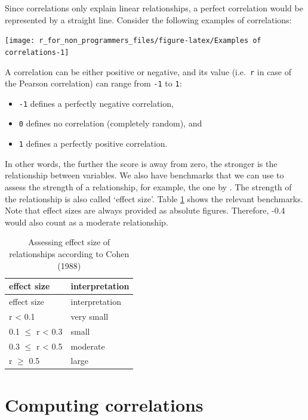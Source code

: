 \documentclass[
]{book}
\begin{document}
Since correlations only explain linear relationships, a perfect correlation would be represented by a straight line. Consider the following examples of correlations:

\begin{center}\texttt{[image: r\_for\_non\_programmers\_files/figure-latex/Examples of correlations-1]} \end{center}

A correlation can be either positive or negative, and its value (i.e.~\texttt{r} in case of the Pearson correlation) can range from \texttt{-1} to \texttt{1}:

\begin{itemize}
\item
  \texttt{-1} defines a perfectly negative correlation,
\item
  \texttt{0} defines no correlation (completely random), and
\item
  \texttt{1} defines a perfectly positive correlation.
\end{itemize}

In other words, the further the score is away from zero, the stronger is the relationship between variables. We also have benchmarks that we can use to assess the strength of a relationship, for example, the one by \citet{cohen1988statistical}. The strength of the relationship is also called `effect size'. Table \ref{tab:effect-size-cohen} shows the relevant benchmarks. Note that effect sizes are always provided as absolute figures. Therefore, -0.4 would also count as a moderate relationship.

\begin{longtable}[]{@{}ll@{}}
\caption{\label{tab:effect-size-cohen} Assessing effect size of relationships according to Cohen (1988)}\tabularnewline
\toprule
effect size & interpretation \\
\midrule
\endfirsthead
\toprule
effect size & interpretation \\
\midrule
\endhead
r \textless{} 0.1 & very small \\
0.1 \(\leq\) r \textless{} 0.3 & small \\
0.3 \(\leq\) r \textless{} 0.5 & moderate \\
r \(\geq\) 0.5 & large \\
\bottomrule
\end{longtable}

\hypertarget{computing-correlations}{%
\section{Computing correlations}\label{computing-correlations}}
\end{document}
